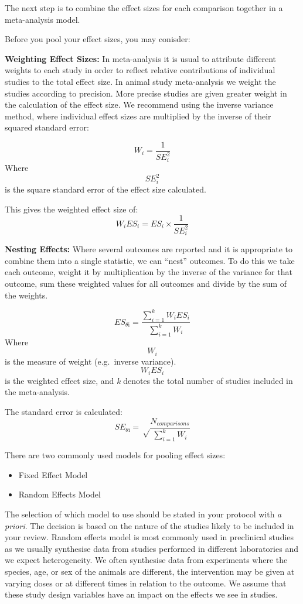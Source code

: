 \documentclass[
]{book}
\begin{document}
The next step is to combine the effect sizes for each comparison together in a meta-analysis model.

Before you pool your effect sizes, you may conisder:

\textbf{Weighting Effect Sizes:}
In meta-analysis it is usual to attribute different weights to each study in order to reflect relative contributions of individual studies to the total effect size. In animal study meta-analysis we weight the studies according to precision. More precise studies are given greater weight in the calculation of the effect size. We recommend using the inverse variance method, where individual effect sizes are multiplied by the inverse of their squared standard error:

\[W_i = \frac{1}{SE^2_i} \]
Where \[{SE^2_i}\] is the square standard error of the effect size calculated.

This gives the weighted effect size of:
\[W_iES_i = ES_i \times \frac{1}{SE^2_i} \]

\textbf{Nesting Effects:}
Where several outcomes are reported and it is appropriate to combine them into a single statistic, we can ``nest'' outcomes. To do this we take each outcome, weight it by multiplication by the inverse of the variance for that outcome, sum these weighted values for all outcomes and divide by the sum of the weights.

\[ES_{\theta\text{i}} = \frac{\sum_{i=1}^{k} W_iES_i}{\sum_{i=1}^{k} W_i} \]
Where \[W_i\] is the measure of weight (e.g.~inverse variance). \[W_iES_i \] is the weighted effect size, and \emph{k} denotes the total number of studies included in the meta-analysis.

The standard error is calculated:
\[SE_{\theta\text{i}} = \sqrt \frac{N_{comparisons}}{\sum_{i=1}^{k} W_i} \]

There are two commonly used models for pooling effect sizes:

\begin{itemize}
\item
  Fixed Effect Model
\item
  Random Effects Model
\end{itemize}

The selection of which model to use should be stated in your protocol with \emph{a priori}. The decision is based on the nature of the studies likely to be included in your review. Random effects model is most commonly used in preclinical studies as we usually synthesise data from studies performed in different laboratories and we expect heterogeneity. We often synthesise data from experiments where the species, age, or sex of the animals are different, the intervention may be given at varying doses or at different times in relation to the outcome. We assume that these study design variables have an impact on the effects we see in studies.
\end{document}
